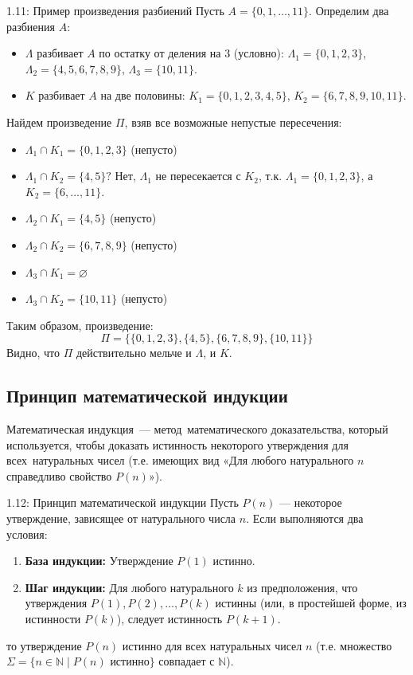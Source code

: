 \documentclass[a4paper,12pt]{article}
\begin{document}
\begin{examplebox}{1.11: Пример произведения разбиений}
	Пусть $A = \{0,1,\dots,11\}$. Определим два разбиения $A$:
	\begin{itemize}
		\item $\Lambda$ разбивает $A$ по остатку от деления на 3 (условно):
		$\Lambda_1 = \{0,1,2,3\}$,
		$\Lambda_2 = \{4,5,6,7,8,9\}$,
		$\Lambda_3 = \{10,11\}$.
		\item $K$ разбивает $A$ на две половины:
		$K_1 = \{0,1,2,3,4,5\}$,
		$K_2 = \{6,7,8,9,10,11\}$.
	\end{itemize}
	Найдем произведение $\Pi$, взяв все возможные непустые пересечения:
	\begin{itemize}
		\item $\Lambda_1 \cap K_1 = \{0,1,2,3\}$ (непусто)
		\item $\Lambda_1 \cap K_2 = \{4,5\}?$ Нет, $\Lambda_1$ не пересекается с $K_2$, т.к. $\Lambda_1 = \{0,1,2,3\}$, а $K_2 = \{6,\dots,11\}$.
		\item $\Lambda_2 \cap K_1 = \{4,5\}$ (непусто)
		\item $\Lambda_2 \cap K_2 = \{6,7,8,9\}$ (непусто)
		\item $\Lambda_3 \cap K_1 = \varnothing$
		\item $\Lambda_3 \cap K_2 = \{10,11\}$ (непусто)
	\end{itemize}
	Таким образом, произведение:
	\[ \Pi = \{ \{0,1,2,3\}, \{4,5\}, \{6,7,8,9\}, \{10,11\} \} \]
	Видно, что $\Pi$ действительно мельче и $\Lambda$, и $K$.
\end{examplebox}

\subsection{Принцип математической индукции}

Математическая индукция — метод математического доказательства, который используется, чтобы доказать истинность некоторого утверждения для всех натуральных чисел (т.е. имеющих вид «Для любого натурального $n$ справедливо свойство $P(n)$»).

\begin{theorembox}{1.12: Принцип математической индукции}
	Пусть $P(n)$ — некоторое утверждение, зависящее от натурального числа $n$. Если выполняются два условия:
	\begin{enumerate}
		\item \textbf{База индукции:} Утверждение $P(1)$ истинно.
		\item \textbf{Шаг индукции:} Для любого натурального $k$ из предположения, что утверждения $P(1), P(2), \dots, P(k)$ истинны (или, в простейшей форме, из истинности $P(k)$), следует истинность $P(k+1)$.
	\end{enumerate}
	то утверждение $P(n)$ истинно для всех натуральных чисел $n$ (т.е. множество $\Sigma = \{ n \in \mathbb{N} \mid P(n) \text{ истинно} \}$ совпадает с $\mathbb{N}$).
\end{theorembox}
\end{document}
